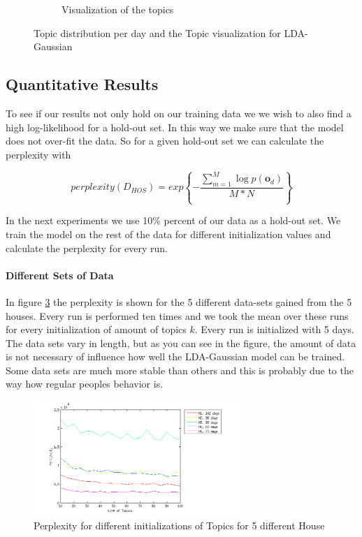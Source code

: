 \documentclass[11pt,a4paper]{article}
\begin{document}
\begin{figure}[h!]
\begin{subfigure}[b]{0.45\linewidth}
  \caption{Visualization of the topics}
  \label{fig:GausTopVisu48}
 \end{subfigure}
 \caption{Topic distribution per day and the Topic visualization for LDA-Gaussian}
 \label{fig:Gaus48}
\end{figure}


\pagebreak


\subsection{Quantitative Results}
To see if our results not only hold on our training data we we wish to also find a high log-likelihood for a hold-out set. In this way we make sure that the model does not over-fit the data. So for a given hold-out set we can calculate the perplexity with 

\begin{equation}
 perplexity(D_{HOS}) = exp \left\{ - \frac{\sum_{m=1}^M \log p(\textbf{o}_d ) }{M*N} \right\}
\end{equation}

In the next experiments we use 10\% percent of our data as a hold-out set. We train the model on the rest of the data for different initialization values and calculate the perplexity for every run.

\paragraph{Different Sets of Data}
In figure \ref{fig:PerplGaus} the perplexity is shown for the 5 different data-sets gained from the 5 houses. Every run is performed ten times and we took the mean over these runs for every initialization of amount of topics $k$. Every run is initialized with 5 days.
The data sets vary in length, but as you can see in the figure, the amount of data is not necessary of influence how well the LDA-Gaussian model can be trained. Some data sets are much more stable than others and this is probably due to the way how regular peoples behavior is.

\begin{figure}[h!]
 \centering
 \includegraphics[width=0.7\textwidth]{Pictures/PerplGaus.png}
 \caption{Perplexity for different initializations of Topics for 5 different House}
 \label{fig:PerplGaus}
\end{figure}
\end{document}

